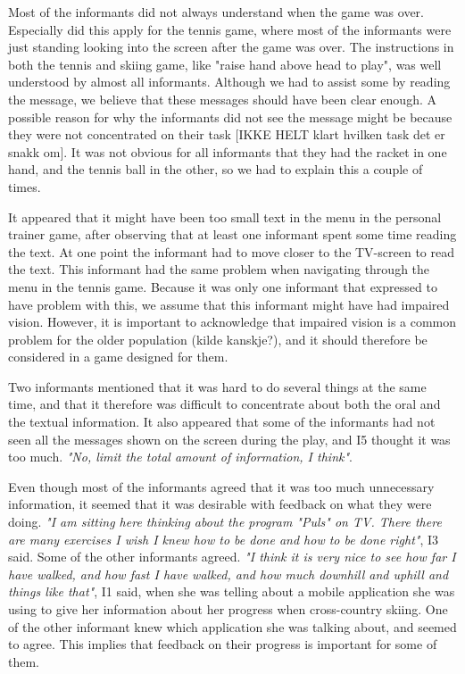 Most of the informants did not always understand when the game was over. Especially did this apply for the tennis game, where most of the informants were just standing looking into the screen after the game was over.  The instructions in both the tennis and skiing game, like "raise hand above head to play", was well understood by almost all informants. Although we had to assist some by reading the message, we believe that these messages should have been clear enough. A possible reason for why the informants did not see the message might be because they were not concentrated on their task [IKKE HELT klart hvilken task det er snakk om]. It was not obvious for all informants that they had the racket in one hand, and the tennis ball in the other, so we had to explain this a couple of times. 

It appeared that it might have been too small text in the menu in the personal trainer game, after observing that at least one informant spent some time reading the text. At one point the informant had to move closer to the TV-screen to read the text. This informant had the same problem when navigating through the menu in the tennis game. Because it was only one informant that expressed to have problem with this, we assume that this informant might have had impaired vision. However, it is important to acknowledge that impaired vision is a common problem for the older population (kilde kanskje?), and it should therefore be considered in a game designed for them. 

Two informants mentioned that it was hard to do several things at the same time, and that it therefore was difficult to concentrate about both the oral and the textual information. It also appeared that some of the informants had not seen all the messages shown on the screen during the play, and I5 thought it was too much. \emph{"No, limit the total amount of information, I think"}. 

Even though most of the informants agreed that it was too much unnecessary information, it seemed that it was desirable with feedback on what they were doing. \emph{"I am sitting here thinking about the program "Puls" on TV. There there are many exercises I wish I knew how to be done and how to be done right"}, I3 said. Some of the other informants agreed. \emph{"I think it is very nice to see how far I have walked, and how fast I have walked, and how much downhill and uphill and things like that"}, I1 said, when she was telling about a mobile application she was using to give her information about her progress when cross-country skiing. One of the other informant knew which application she was talking about, and seemed to agree. This implies that feedback on their progress is important for some of them.  

